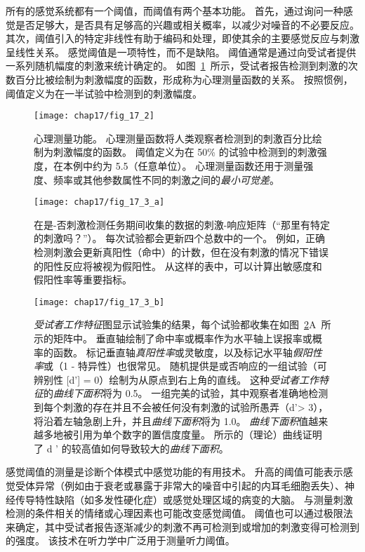 所有的感觉系统都有一个阈值，而阈值有两个基本功能。 
首先，通过询问一种感觉是否足够大，是否具有足够高的兴趣或相关概率，以减少对噪音的不必要反应。
其次，阈值引入的特定非线性有助于编码和处理，即使其余的主要感觉反应与刺激呈线性关系。
感觉阈值是一项特性，而不是缺陷。 
阈值通常是通过向受试者提供一系列随机幅度的刺激来统计确定的。
如图~\ref{fig:17_2}~所示，受试者报告检测到刺激的次数百分比被绘制为刺激幅度的函数，形成称为心理测量函数的关系。
按照惯例，阈值定义为在一半试验中检测到的刺激幅度。


\begin{figure}[htbp]
	\centering
	\texttt{[image: chap17/fig\_17\_2]}
	\caption{心理测量功能。
		心理测量函数将人类观察者检测到的刺激百分比绘制为刺激幅度的函数。 
		阈值定义为在 50\% 的试验中检测到的刺激强度，在本例中约为 5.5（任意单位）。 
		心理测量函数还用于测量强度、频率或其他参数属性不同的刺激之间的\textit{最小可觉差}。}
	\label{fig:17_2}
\end{figure}


\begin{figure}[htbp]
	\centering
	\texttt{[image: chap17/fig\_17\_3\_a]}
	\caption{在是-否刺激检测任务期间收集的数据的刺激-响应矩阵（“那里有特定的刺激吗？”）。
		每次试验都会更新四个总数中的一个。
		例如，正确检测刺激会更新真阳性（命中）的计数，但在没有刺激的情况下错误的阳性反应将被视为假阳性。
		从这样的表中，可以计算出敏感度和假阳性率等重要指标。}
	\label{fig:17_3_a}
\end{figure}


\begin{figure}[htbp]
	\centering
	\texttt{[image: chap17/fig\_17\_3\_b]}
	\caption{\textit{受试者工作特征}图显示试验集的结果，每个试验都收集在如图~\ref{fig:17_3_a}A~所示的矩阵中。
		垂直轴绘制了命中率或概率作为水平轴上误报率或概率的函数。
		标记垂直轴\textit{真阳性率}或灵敏度，以及标记水平轴\textit{假阳性率}或（1 - 特异性）也很常见。
		随机提供是或否响应的一组试验（可辨别性 [d'] = 0）绘制为从原点到右上角的直线。
		这种\textit{受试者工作特征}的\textit{曲线下面积}将为 0.5。
		一组完美的试验，其中观察者准确地检测到每个刺激的存在并且不会被任何没有刺激的试验所愚弄（d'> 3），将沿着左轴急剧上升，并且\textit{曲线下面积}将为 1.0。
		\textit{曲线下面积}值越来越多地被引用为单个数字的置信度度量。
		所示的（理论）曲线证明了 d ' 的较高值如何导致较大的\textit{曲线下面积}\cite{swets1973relative}。}
	\label{fig:17_3_b}
\end{figure}


感觉阈值的测量是诊断个体模式中感觉功能的有用技术。 
升高的阈值可能表示感觉受体异常（例如由于衰老或暴露于非常大的噪音中引起的内耳毛细胞丢失）、神经传导特性缺陷（如多发性硬化症）或感觉处理区域的病变的大脑。
与测量刺激检测的条件相关的情绪或心理因素也可能改变感觉阈值。
阈值也可以通过极限法来确定，其中受试者报告逐渐减少的刺激不再可检测到或增加的刺激变得可检测到的强度。
该技术在听力学中广泛用于测量听力阈值。


